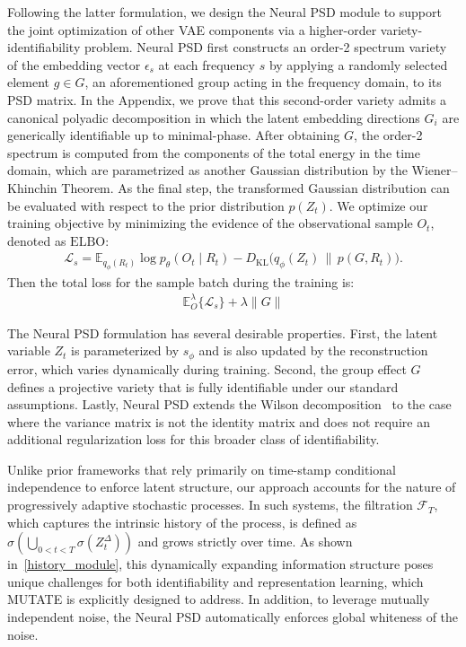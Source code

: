 \documentclass[10pt]{article}
\numberwithin{figure}{section}
\begin{document}
Following the latter formulation, we design the Neural PSD module to support the joint optimization of other VAE components via a higher-order variety-identifiability problem. Neural PSD first constructs an order-2 spectrum variety of the embedding vector $\epsilon_s$ at each frequency $s$ by applying a randomly selected element $g \in G$, an aforementioned group acting in the frequency domain, to its PSD matrix. In the Appendix, we prove that this second-order variety admits a canonical polyadic decomposition in which the latent embedding directions $G_i$ are generically identifiable up to minimal-phase. After obtaining $G$, the order-2 spectrum is computed from the components of the total energy in the time domain, which are parametrized as another Gaussian distribution by the Wiener–Khinchin Theorem. As the final step, the transformed Gaussian distribution can be evaluated with respect to the prior distribution $p(Z_t)$. We optimize our training objective by minimizing the evidence of the  observational sample $O_t$, denoted as $\mathrm{ELBO}$:
\begin{align}
\mathcal{L}_s=\mathbb{E}_{q_{\phi}(R_t)} \log p_{\theta}(O_t \mid R_t)- D_{\mathrm{KL}}\bigl(q_{\phi}(Z_t)\,\|\,p(G,R_t)\bigr).
\end{align}
Then the total loss for the sample batch during the training is:
\begin{align*}
    \mathbb{E}_{O}^{\lambda}\{\mathcal{L}_s\} + \lambda \lVert G \rVert
\end{align*}

The Neural PSD formulation has several desirable properties. First, the latent variable $Z_t$ is parameterized by $s_{\phi}$ and is also updated by the reconstruction error, which varies dynamically during training. Second, the group effect $G$ defines a projective variety that is fully identifiable under our standard assumptions. Lastly, Neural PSD extends the Wilson decomposition~\citep{WILSON1978222} to the case where the variance matrix is not the identity matrix and does not require an additional regularization loss for this broader class of identifiability.

Unlike prior frameworks that rely primarily on time-stamp conditional independence to enforce latent structure, our approach accounts for the nature of progressively adaptive stochastic processes. In such systems, the filtration $\mathcal{F}_T$, which captures the intrinsic history of the process, is defined as $\sigma\left( \bigcup_{0 < t < T} \sigma(Z_t^{\Delta}) \right)$ and grows strictly over time. As shown in~\autoref{history_module}, this dynamically expanding information structure poses unique challenges for both identifiability and representation learning, which \textsc{MUTATE} is explicitly designed to address. In addition, to leverage mutually independent noise, the Neural PSD automatically enforces global whiteness of the noise.
\end{document}
